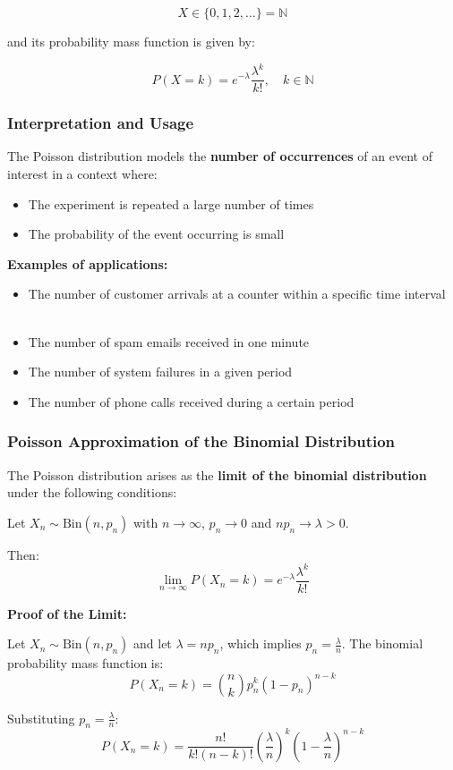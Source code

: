 \documentclass[12pt]{article}
\begin{document}
$$X \in \{0, 1, 2, \ldots\} = \mathbb{N}$$

and its probability mass function is given by:

$$P(X = k) = e^{-\lambda} \frac{\lambda^k}{k!}, \quad k \in \mathbb{N}$$

\subsubsection{Interpretation and Usage}

The Poisson distribution models the \textbf{number of occurrences} of an event of interest in a context where:
\begin{itemize}
    \item The experiment is repeated a large number of times
    \item The probability of the event occurring is small
\end{itemize}

\textbf{Examples of applications:}
\begin{itemize}
    \item The number of customer arrivals at a counter within a specific time interval
    \item The number of spam emails received in one minute
    \item The number of system failures in a given period
    \item The number of phone calls received during a certain period
\end{itemize}

\subsubsection{Poisson Approximation of the Binomial Distribution}

The Poisson distribution arises as the \textbf{limit of the binomial distribution} under the following conditions:

Let $X_n \sim \text{Bin}(n, p_n)$ with $n \to \infty$, $p_n \to 0$ and $np_n \to \lambda > 0$.

Then:
$$\lim_{n \to \infty} P(X_n = k) = e^{-\lambda} \frac{\lambda^k}{k!}$$

\textbf{Proof of the Limit:}

Let $X_n \sim \text{Bin}(n, p_n)$ and let $\lambda = np_n$, which implies $p_n = \frac{\lambda}{n}$.
The binomial probability mass function is:
$$P(X_n = k) = \binom{n}{k} p_n^k (1 - p_n)^{n-k}$$

Substituting $p_n = \frac{\lambda}{n}$:
$$P(X_n = k) = \frac{n!}{k!(n-k)!} \left(\frac{\lambda}{n}\right)^k \left(1 - \frac{\lambda}{n}\right)^{n-k}$$
\end{document}
